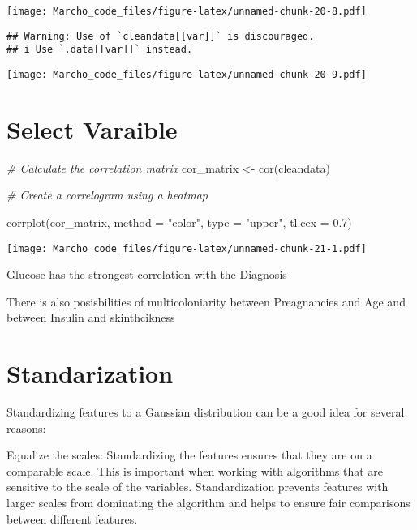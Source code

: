 \documentclass[
]{article}
\newenvironment{Shaded}{\begin{snugshade}}{\end{snugshade}}
\newcommand{\AttributeTok}[1]{\textcolor[rgb]{0.77,0.63,0.00}{#1}}
\newcommand{\CommentTok}[1]{\textcolor[rgb]{0.56,0.35,0.01}{\textit{#1}}}
\newcommand{\FloatTok}[1]{\textcolor[rgb]{0.00,0.00,0.81}{#1}}
\newcommand{\FunctionTok}[1]{\textcolor[rgb]{0.00,0.00,0.00}{#1}}
\newcommand{\NormalTok}[1]{#1}
\newcommand{\OtherTok}[1]{\textcolor[rgb]{0.56,0.35,0.01}{#1}}
\newcommand{\StringTok}[1]{\textcolor[rgb]{0.31,0.60,0.02}{#1}}
\begin{document}
\texttt{[image: Marcho\_code\_files/figure-latex/unnamed-chunk-20-8.pdf]}

\begin{verbatim}
## Warning: Use of `cleandata[[var]]` is discouraged.
## i Use `.data[[var]]` instead.
\end{verbatim}

\texttt{[image: Marcho\_code\_files/figure-latex/unnamed-chunk-20-9.pdf]}

\hypertarget{select-varaible}{%
\section{Select Varaible}\label{select-varaible}}

\begin{Shaded}
\begin{Highlighting}[]
\CommentTok{\# Calculate the correlation matrix}
\NormalTok{cor\_matrix }\OtherTok{\textless{}{-}} \FunctionTok{cor}\NormalTok{(cleandata)}

\CommentTok{\# Create a correlogram using a heatmap}

\FunctionTok{corrplot}\NormalTok{(cor\_matrix, }\AttributeTok{method =} \StringTok{"color"}\NormalTok{, }\AttributeTok{type =} \StringTok{"upper"}\NormalTok{, }\AttributeTok{tl.cex =} \FloatTok{0.7}\NormalTok{)}
\end{Highlighting}
\end{Shaded}

\texttt{[image: Marcho\_code\_files/figure-latex/unnamed-chunk-21-1.pdf]}

Glucose has the strongest correlation with the Diagnosis

There is also posisbilities of multicoloniarity between Preagnancies and
Age and between Insulin and skinthcikness

\hypertarget{standarization}{%
\section{Standarization}\label{standarization}}

Standardizing features to a Gaussian distribution can be a good idea for
several reasons:

Equalize the scales: Standardizing the features ensures that they are on
a comparable scale. This is important when working with algorithms that
are sensitive to the scale of the variables. Standardization prevents
features with larger scales from dominating the algorithm and helps to
ensure fair comparisons between different features.
\end{document}
